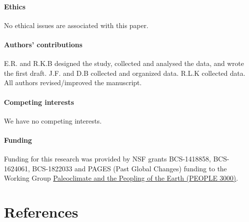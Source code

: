 \documentclass[
]{sa}
\begin{document}
\hypertarget{ethics}{%
\paragraph*{Ethics}\label{ethics}}

No ethical issues are associated with this paper.

\hypertarget{authors-contributions}{%
\paragraph*{Authors' contributions}\label{authors-contributions}}

E.R. and R.K.B designed the study, collected and analysed the data, and wrote the first draft. J.F. and D.B collected and organized data. R.L.K collected data. All authors revised/improved the manuscript.

\hypertarget{competing-interests}{%
\paragraph*{Competing interests}\label{competing-interests}}

We have no competing interests.

\hypertarget{funding}{%
\paragraph*{Funding}\label{funding}}

Funding for this research was provided by NSF grants BCS-1418858, BCS-1624061, BCS-1822033 and PAGES (Past Global Changes) funding to the Working Group \href{http://www.pastglobalchanges.org/ini/wg/arctic2k/170-initiatives/working-group/people-3000/1732-people-3000}{Paleoclimate and the Peopling of the Earth (PEOPLE 3000)}.

\newpage

\hypertarget{references}{%
\section*{References}\label{references}}
\end{document}
